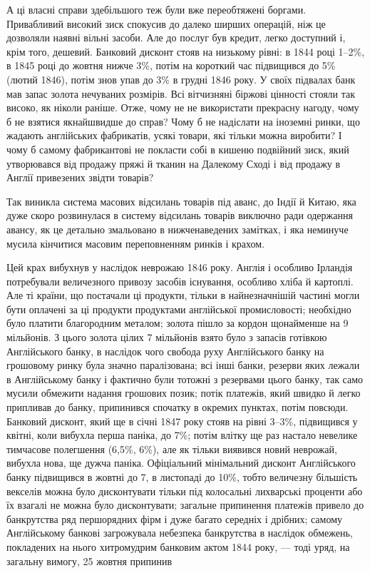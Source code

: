 А ці власні справи здебільшого теж були вже переобтяжені боргами. Привабливий високий зиск спокусив
до далеко
ширших операцій, ніж це дозволяли наявні вільні засоби. Але до
послуг був кредит, легко доступний і, крім того, дешевий. Банковий дисконт стояв на низькому рівні:
в 1844 році 1--2\%, в 1845 році до жовтня нижче 3\%, потім на короткий час підвищився до 5\%
(лютий 1846), потім знов упав до 3\% в грудні
1846 року. У своїх підвалах банк мав запас золота нечуваних
розмірів. Всі вітчизняні біржові цінності стояли так високо, як ніколи раніше. Отже, чому не не
використати прекрасну нагоду,
чому б не взятися якнайшвидше до справ? Чому б не надіслати
на іноземні ринки, що жадають англійських фабрикатів, усякі
товари, які тільки можна виробити? І чому б самому фабрикантові не покласти собі в кишеню подвійний
зиск, який утворювався від продажу пряжі й тканин на Далекому Сході і від
продажу в Англії привезених звідти товарів?

Так виникла система масових відсилань товарів під аванс, до
Індії й Китаю, яка дуже скоро розвинулася в систему відсилань
товарів виключно ради одержання авансу, як це детально змальовано в нижченаведених замітках, і яка
неминуче мусила кінчитися масовим переповненням ринків і крахом.

Цей крах вибухнув у наслідок неврожаю 1846 року. Англія
і особливо Ірландія потребували величезного привозу засобів
існування, особливо хліба й картоплі. Але ті країни, що постачали ці продукти, тільки в
найнезначнішій частині могли бути
оплачені за ці продукти продуктами англійської промисловості;
необхідно було платити благородним металом; золота пішло за
кордон щонайменше на 9 мільйонів. З цього золота цілих
7 мільйонів взято було з запасів готівкою Англійського банку,
в наслідок чого свобода руху Англійського банку на грошовому
ринку була значно паралізована; всі інші банки, резерви яких
лежали в Англійському банку і фактично були тотожні з резервами цього банку, так само мусили
обмежити надання грошових
позик; потік платежів, який швидко й легко припливав до банку,
припинився спочатку в окремих пунктах, потім повсюди. Банковий дисконт, який ще в січні 1847 року
стояв на рівні 3--3\%, підвищився у квітні, коли вибухла перша паніка, до 7\%; потім влітку
ще раз настало невелике тимчасове полегшення (6,5\%, 6\%), але
як тільки виявився новий неврожай, вибухла нова, ще дужча паніка. Офіціальний мінімальний дисконт
Англійського банку підвищився в жовтні до 7, в листопаді до 10\%, тобто величезну більшість векселів
можна було дисконтувати тільки під колосальні
лихварські проценти або їх взагалі не можна було дисконтувати;
загальне припинення платежів привело до банкрутства ряд першорядних фірм і дуже багато середніх і
дрібних; самому Англійському банкові загрожувала небезпека банкрутства в наслідок
обмежень, покладених на нього хитромудрим банковим актом
1844 року, — тоді уряд, на загальну вимогу, 25 жовтня припинив
\parbreak{}  %
